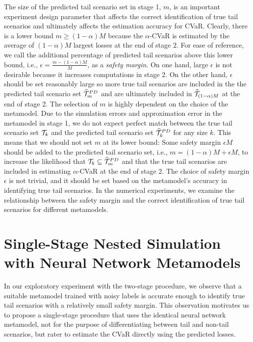 The size of the predicted tail scenario set in stage 1, $m$, is an important experiment design parameter that affects the correct identification of true tail scenarios and ultimately affects the estimation accuracy for CVaR.
Clearly, there is a lower bound $m \geq (1-\alpha)M$ because the $\alpha$-CVaR is estimated by the average of $(1-\alpha)M$ largest losses at the end of stage 2.
For ease of reference, we call the additional percentage of predicted tail scenarios above this lower bound, i.e., $\epsilon = \frac{m - (1-\alpha)M}{M}$, as a \textit{safety margin}.
On one hand, large $\epsilon$ is not desirable because it increases computations in stage 2.
On the other hand, $\epsilon$ should be set reasonably large so more true tail scenarios are included in the the predicted tail scenario set $\widehat{\mathcal{T}}_{m}^{PD}$ and are ultimately included in $\widehat{\mathcal{T}}_{(1-\alpha )M}$ at the end of stage 2.
The selection of $m$ is highly dependent on the choice of the metamodel.
Due to the simulation errors and approximation error in the metamodel in stage 1, we do not expect perfect match between the true tail scenario set $\mathcal{T}_{k}$ and the predicted tail scenario set $\widehat{\mathcal{T}}_{k}^{PD}$ for any size $k$.
This means that we should not set $m$ at its lower bound: Some safety margin $\epsilon M$ should be added to the predicted tail scenario set, i.e., $m = (1-\alpha )M + \epsilon M$, to increase the likelihood that $\mathcal{T}_{k} \subseteq \widehat{\mathcal{T}}_{m}^{PD}$ and that the true tail scenarios are included in estimating $\alpha$-CVaR at the end of stage 2.
The choice of safety margin $\epsilon$ is not trivial, and it should be set based on the metamodel's accuracy in identifying true tail scenarios.
In the numerical experiments, we examine the relationship between the safety margin and the correct identification of true tail scenarios for different metamodels.

\section{Single-Stage Nested Simulation with Neural Network Metamodels} \label{sec2:metamodel1Stage}

In our exploratory experiment with the two-stage procedure, we observe that a suitable metamodel trained with noisy labels is accurate enough to identify true tail scenarios with a relatively small safety margin.
This observation motivates us to propose a single-stage procedure that uses the identical neural network metamodel, not for the purpose of differentiating between tail and non-tail scenarios, but rater to estimate the CVaR directly using the predicted losses. 

